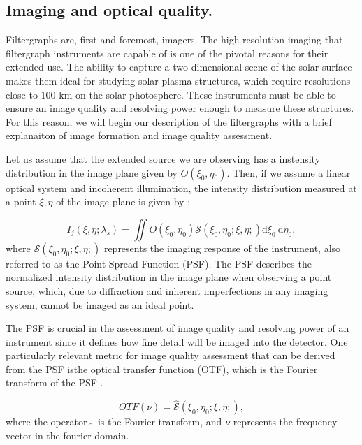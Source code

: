 \subsection{Imaging and optical quality.\label{sec: intro-imaging}}

Filtergraphs are, first and foremost, imagers. The high-resolution imaging that filtergraph instruments are capable of is one of the pivotal reasons for their extended use. The ability to capture a two-dimensional scene of the solar surface makes them ideal for studying solar plasma structures, which require resolutions close to 100 km on the solar photosphere. These instruments must be able to ensure an image quality and resolving power enough to measure these structures. For this reason, we will begin our description of the filtergraphs with a brief explanaiton of image formation and image quality assessment. 

Let us assume that the extended source we are observing has a instensity distribution in the image plane given by $O(\xi _ 0, \eta _ 0)$. Then, if we assume a linear optical system and incoherent illumination, the intensity distribution measured at a point $\xi, \eta$ of the image plane is given by : 

\begin{equation}
  I_ j\left(\xi, \eta ; \lambda_{s}\right)= \iint  O\left(\xi_0, \eta_0\right)  \mathcal{S}\left(\xi_0, \eta_0; \xi , \eta;\right)  \mathrm{d} \xi_{0} \mathrm{~d} \eta_{0},
  \label{eq_imaging: intensity_simple}
\end{equation}
where $\mathcal{S}\left(\xi_0, \eta_0; \xi , \eta;\right)$ represents the imaging response of the instrument, also referred to as the Point Spread Function (PSF). The PSF describes the normalized intensity distribution in the image plane when observing a point source, which, due to diffraction and inherent imperfections in any imaging system, cannot be imaged as an ideal point.

The PSF is crucial in the assessment of image quality and resolving power of an instrument since it defines how fine detail will be imaged into the detector. One particularly relevant metric for image quality assessment that can be derived from the PSF isthe optical transfer function (OTF), which is the Fourier transform of the PSF \citep{vargas_tesis}. 

\begin{equation}
  OTF(\nu) = \hat{\mathcal{S}}\left(\xi_0, \eta_0; \xi , \eta;\right),
\end{equation}
where the operator  $\ \hat{ }\ $  is the Fourier transform, and $\nu$ represents the frequency vector in the fourier domain.

